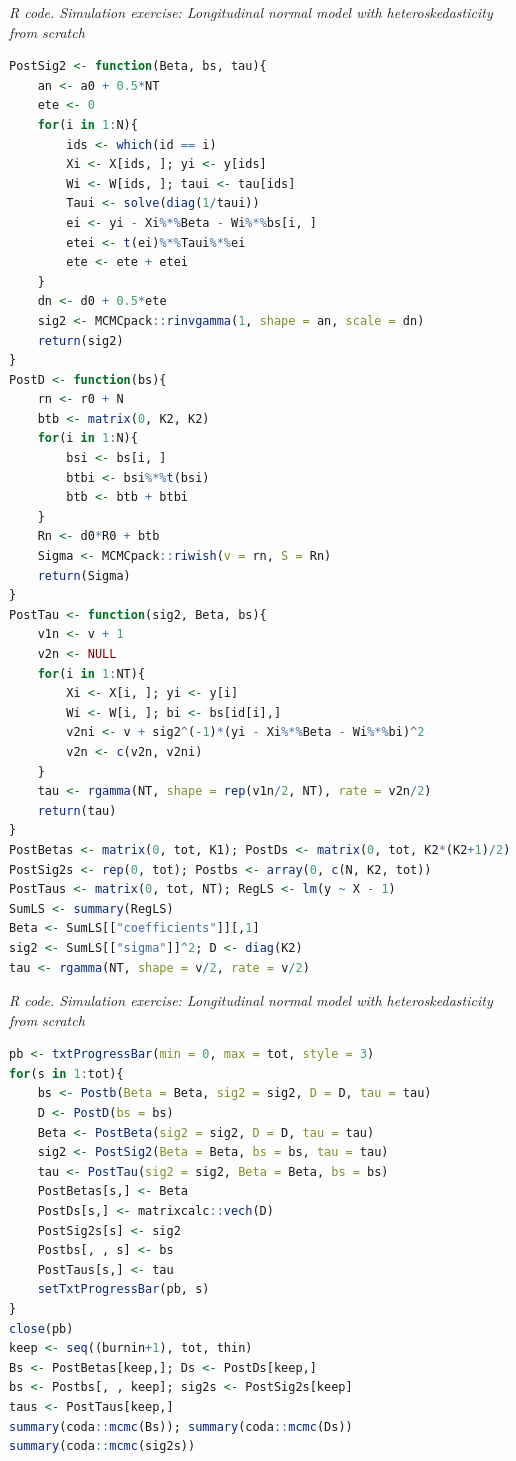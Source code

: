 \begin{tcolorbox}[enhanced,width=4.67in,center upper,
	fontupper=\large\bfseries,drop shadow southwest,sharp corners]
	\textit{R code. Simulation exercise: Longitudinal normal model with heteroskedasticity from scratch}
	\begin{VF}
		\begin{lstlisting}[language=R]
PostSig2 <- function(Beta, bs, tau){
	an <- a0 + 0.5*NT
	ete <- 0
	for(i in 1:N){
		ids <- which(id == i)
		Xi <- X[ids, ]; yi <- y[ids]
		Wi <- W[ids, ]; taui <- tau[ids]
		Taui <- solve(diag(1/taui))
		ei <- yi - Xi%*%Beta - Wi%*%bs[i, ]
		etei <- t(ei)%*%Taui%*%ei
		ete <- ete + etei
	}
	dn <- d0 + 0.5*ete 
	sig2 <- MCMCpack::rinvgamma(1, shape = an, scale = dn)
	return(sig2)
}
PostD <- function(bs){
	rn <- r0 + N
	btb <- matrix(0, K2, K2)
	for(i in 1:N){
		bsi <- bs[i, ]
		btbi <- bsi%*%t(bsi)
		btb <- btb + btbi
	}
	Rn <- d0*R0 + btb
	Sigma <- MCMCpack::riwish(v = rn, S = Rn)
	return(Sigma)
}
PostTau <- function(sig2, Beta, bs){
	v1n <- v + 1
	v2n <- NULL
	for(i in 1:NT){
		Xi <- X[i, ]; yi <- y[i]
		Wi <- W[i, ]; bi <- bs[id[i],]
		v2ni <- v + sig2^(-1)*(yi - Xi%*%Beta - Wi%*%bi)^2
		v2n <- c(v2n, v2ni)
	}
	tau <- rgamma(NT, shape = rep(v1n/2, NT), rate = v2n/2)
	return(tau)
}
PostBetas <- matrix(0, tot, K1); PostDs <- matrix(0, tot, K2*(K2+1)/2)
PostSig2s <- rep(0, tot); Postbs <- array(0, c(N, K2, tot))
PostTaus <- matrix(0, tot, NT); RegLS <- lm(y ~ X - 1)
SumLS <- summary(RegLS)
Beta <- SumLS[["coefficients"]][,1]
sig2 <- SumLS[["sigma"]]^2; D <- diag(K2)
tau <- rgamma(NT, shape = v/2, rate = v/2) 
\end{lstlisting}
	\end{VF}
\end{tcolorbox}

\begin{tcolorbox}[enhanced,width=4.67in,center upper,
	fontupper=\large\bfseries,drop shadow southwest,sharp corners]
	\textit{R code. Simulation exercise: Longitudinal normal model with heteroskedasticity from scratch}
	\begin{VF}
		\begin{lstlisting}[language=R]
pb <- txtProgressBar(min = 0, max = tot, style = 3)
for(s in 1:tot){
	bs <- Postb(Beta = Beta, sig2 = sig2, D = D, tau = tau)
	D <- PostD(bs = bs)
	Beta <- PostBeta(sig2 = sig2, D = D, tau = tau)
	sig2 <- PostSig2(Beta = Beta, bs = bs, tau = tau)
	tau <- PostTau(sig2 = sig2, Beta = Beta, bs = bs)
	PostBetas[s,] <- Beta
	PostDs[s,] <- matrixcalc::vech(D)
	PostSig2s[s] <- sig2
	Postbs[, , s] <- bs
	PostTaus[s,] <- tau
	setTxtProgressBar(pb, s)
}
close(pb)
keep <- seq((burnin+1), tot, thin)
Bs <- PostBetas[keep,]; Ds <- PostDs[keep,]
bs <- Postbs[, , keep]; sig2s <- PostSig2s[keep]
taus <- PostTaus[keep,]
summary(coda::mcmc(Bs)); summary(coda::mcmc(Ds))
summary(coda::mcmc(sig2s))
\end{lstlisting}
	\end{VF}
\end{tcolorbox}

